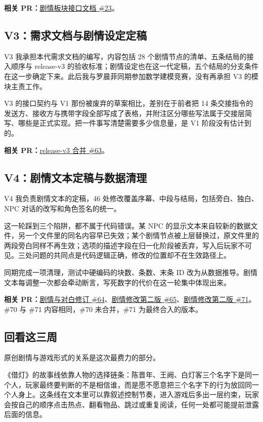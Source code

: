 \textbf{相关 PR：}\href{https://github.com/214notfound/jiedeng/pull/23}{剧情板块接口文档 \#23}。

\subsection{V3：需求文档与剧情设定定稿}

V3 我承担本代需求文档的编写，内容包括 28 个剧情节点的清单、五条结局的接入顺序与 release-v3 的验收标准；剧情设定也在这一代定稿，五个结局的分支条件在这一步确定下来。此后我与罗晨菲同期参加数学建模竞赛，没有再承担 V3 的模块主责工作。

V3 的接口契约与 V1 那份被废弃的草案相比，差别在于前者把 14 条交接指令的发送方、接收方与携带字段全部写成了表格，并附注区分哪些写法属于交接层简写、哪些是正式实现。把一件事写清楚需要多少信息量，是 V1 阶段没有估计到的。

\textbf{相关 PR：}\href{https://github.com/214notfound/jiedeng/pull/63}{release-v3 合并 \#63}。

\subsection{V4：剧情文本定稿与数据清理}

V4 我负责剧情文本的定稿，46 处修改覆盖序幕、中段与结局，包括旁白、独白、NPC 对话的改写和角色签名的统一。

这一轮踩到三个陷阱，都不属于代码错误。某 NPC 的显示文本来自较新的数据文件，另一个文件里的同名内容早已失效；某个剧情节点被上层替换过，原文件里的两段旁白同样不再生效；选项的描述字段在归一化阶段被丢弃，写入后玩家不可见。三处问题的共同点是代码逻辑正确，修改的位置却不在生效路径上。

同期完成一项清理，测试中硬编码的块数、条数、末条 ID 改为从数据推导。剧情文本每调整一次都会牵动断言，写死数字的代价在这一轮集中体现出来。

\textbf{相关 PR：}\href{https://github.com/214notfound/jiedeng/pull/64}{剧情与对白修订 \#64}、\href{https://github.com/214notfound/jiedeng/pull/65}{剧情修改第二版 \#65}、\href{https://github.com/214notfound/jiedeng/pull/71}{剧情修改第二版 \#71}。\#70 与 \#71 内容相同，\#70 未合并，\#71 为最终合入的版本。

\subsection{回看这三周}

原创剧情与游戏形式的关系是这次最费力的部分。

《借灯》的故事线依靠人物的选择链条：陈晋年、王阙、白灯客三个名字下是同一个人，玩家最终要判断的不是相信谁，而是愿不愿意把三个名字下的行为放回同一个人身上。这条线在文本里可以靠叙述控制节奏，进入游戏后多出一层约束，玩家会按自己的顺序点击热点、翻看物品、跳过或重复阅读，任何一处都可能提前泄露后面的信息。

